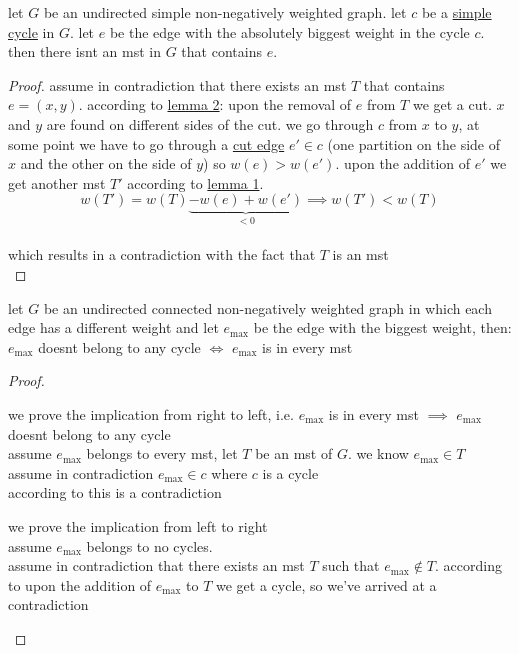 \documentclass[a4paper,12pt]{article}
\begin{document}
\begin{lemma}
let \(G\) be an undirected simple non-negatively weighted graph. let \(c\) be a \href{20230511063703-simple_cycle.org}{simple cycle} in \(G\). let \(e\) be the edge with the absolutely biggest weight in the cycle \(c\). then there isnt an mst in \(G\) that contains \(e\).\\
\begin{proof}
assume in contradiction that there exists an mst \(T\) that contains \(e=(x,y)\). according to \hyperref[orge6bc84e]{lemma 2}: upon the removal of \(e\) from \(T\) we get a cut. \(x\) and \(y\) are found on different sides of the cut. we go through \(c\) from \(x\) to \(y\), at some point we have to go through a \href{20230511074636-cut_edge.org}{cut edge} \(e' \in c\) (one partition on the side of \(x\) and the other on the side of \(y\)) so \(w(e)>w(e')\). upon the addition of \(e'\) we get another mst \(T'\) according to \hyperref[orgdb4b51f]{lemma 1}.\\
\[
w(T') = w(T)\underbrace{-w(e)+w(e')}_{<0} \implies w(T') < w(T)
\]\\
which results in a contradiction with the fact that \(T\) is an mst\\
\end{proof}
\label{org6d3b5d6}
\end{lemma}
\begin{lemma}
let \(G\) be an undirected connected non-negatively weighted graph in which each edge has a different weight and let \(e_{\max}\) be the edge with the biggest weight, then:\\
\(e_{\max}\) doesnt belong to any cycle \(\iff\) \(e_{\max}\) is in every mst\\
\begin{proof}
\begin{step}
we prove the implication from right to left, i.e. \(e_{\max}\) is in every mst \(\implies\) \(e_{\max}\) doesnt belong to any cycle\\
assume \(e_{\max}\) belongs to every mst, let \(T\) be an mst of \(G\). we know \(e_{\max} \in T\)\\
assume in contradiction \(e_{\max} \in c\) where \(c\) is a cycle\\
according to  this is a contradiction\\
\end{step}
\begin{step}
we prove the implication from left to right\\
assume \(e_{\max}\) belongs to no cycles.\\
assume in contradiction that there exists an mst \(T\) such that \(e_{\max} \notin T\). according to  upon the addition of \(e_{\max}\) to \(T\) we get a cycle, so we've arrived at a contradiction\\
\end{step}
\end{proof}
\end{lemma}
\end{document}
